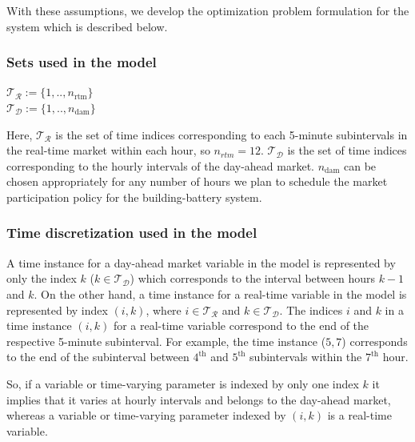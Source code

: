\documentclass[11pt,twoside]{article}
\begin{document}
With these assumptions, we develop the optimization problem formulation for the system which is described below.
\subsubsection{Sets used in the model}
\begin{center}
$\mathcal{T_R} := \{1,..,n_{\textrm{rtm}}\}$\\$ \mathcal{T_D} :=  \{1,..,n_{\textrm{dam}}\}$
\end{center}
Here, $\mathcal{T_R}$ is the set of time indices corresponding to each 5-minute subintervals in the real-time market within each hour, so $n_{rtm}=12$. $\mathcal{T_D}$ is the set of time indices corresponding to the hourly intervals of the day-ahead market. $n_\text{dam}$ can be chosen appropriately for any number of hours we plan to schedule the market participation policy for the building-battery system.
\subsubsection{Time discretization used in the model}
A time instance for a day-ahead market variable in the model is represented by only the index $k$ ($k \in \mathcal{T_D}$) which corresponds to the interval between hours $k-1$ and $k$. On the other hand, a time instance for a real-time variable in the model is represented by index $(i,k)$, where $i \in \mathcal{T_R}$ and $ k \in \mathcal{T_D}$. The indices $i$ and $k$ in a time instance $(i,k)$ for a real-time variable correspond to the end of the respective 5-minute subinterval. For example, the time instance ($5,7$) corresponds to the end of the subinterval between $4^{\text{th}}$ and $5^{\text{th}}$ subintervals within the $7^\textrm{th}$ hour. 

So, if a variable or time-varying parameter is indexed by only one index $k$ it implies that it varies at hourly intervals and belongs to the day-ahead market, whereas a variable or time-varying parameter indexed by $(i,k)$ is a real-time variable. 
\end{document}

